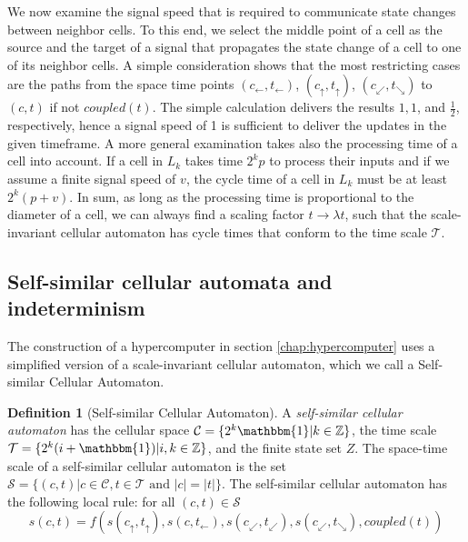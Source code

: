 \documentclass[pre,showpacs,showkeys,preprint]{revtex4}
\theoremstyle{definition}
\newtheorem{defn}{Definition}
\begin{document}
We now examine the signal speed that is required to communicate state changes between neighbor cells.
To this end, we select the middle point of a cell as the source and the target of a
signal that propagates the state change of a cell to one of its neighbor cells.
A simple consideration shows that the most restricting cases are the paths from the space time points
$(c_\leftarrow, t_\leftarrow)$, $(c_\uparrow, t_\uparrow)$, $(c_\swarrow, t_\searrow)$ to $(c,t)$ if not $\mathit{coupled}(t)$.
The simple calculation delivers the results $1,1$, and $\frac{1}{2}$, respectively,
hence a signal speed of 1 is sufficient to deliver the updates in the given timeframe.
A more general examination takes also the processing time of a cell into account.
If a cell in $L_k$ takes time $2^k p$ to process their inputs and if we assume a finite signal speed of $v$,
the cycle time of a cell in $L_k$ must be at least $2^k (p + v)$.
In sum, as long as the processing time is proportional to the diameter of a cell,
we can always find a scaling factor $t \rightarrow \lambda t$, such that
the scale-invariant cellular automaton has cycle times that conform to the time scale $\mathcal{T}$.

\subsection{Self-similar cellular automata and indeterminism}

The construction of a hypercomputer in section \ref{chap:hypercomputer} uses a simplified version of a scale-invariant cellular automaton, which we call
a Self-similar Cellular Automaton.
\begin{defn}[Self-similar Cellular Automaton]
A {\em self-similar cellular automaton} has the cellular space $\mathcal{C} = \{2^k \mathbbm{1} | k \in \mathbb Z\}$,
the time scale $\mathcal{T} = \{2^k (i + \mathbbm{1})| i, k \in \mathbb{Z}\}$, and the finite state set $Z$.
The space-time scale of a self-similar cellular automaton is the set $\mathcal{S} = \{(c,t)| c \in \mathcal{C}, t \in \mathcal{T} \mbox{ and } |c| = |t|\}$.
The self-similar cellular automaton has the following local rule: for all $(c, t) \in \mathcal{S}$
\begin{equation}
s(c,t) =
f(
        s(c_\uparrow, t_\uparrow),
        s(c, t_\leftarrow),
        s(c_\swarrow, t_\swarrow),
        s(c_\swarrow, t_\searrow),
        \mathit{coupled}(t)
)
\end{equation}
\end{defn}
\end{document}
